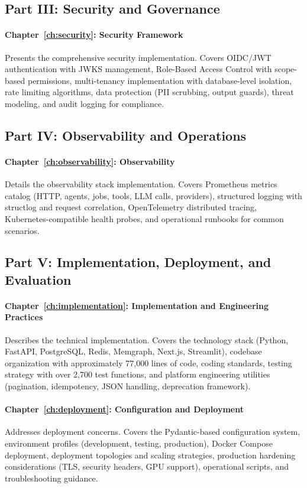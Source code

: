 \subsection{Part III: Security and Governance}

\paragraph{Chapter~\ref{ch:security}: Security Framework}
Presents the comprehensive security implementation. Covers OIDC/JWT authentication with JWKS management, Role-Based Access Control with scope-based permissions, multi-tenancy implementation with database-level isolation, rate limiting algorithms, data protection (PII scrubbing, output guards), threat modeling, and audit logging for compliance.

\subsection{Part IV: Observability and Operations}

\paragraph{Chapter~\ref{ch:observability}: Observability}
Details the observability stack implementation. Covers Prometheus metrics catalog (HTTP, agents, jobs, tools, LLM calls, providers), structured logging with structlog and request correlation, OpenTelemetry distributed tracing, Kubernetes-compatible health probes, and operational runbooks for common scenarios.

\subsection{Part V: Implementation, Deployment, and Evaluation}

\paragraph{Chapter~\ref{ch:implementation}: Implementation and Engineering Practices}
Describes the technical implementation. Covers the technology stack (Python, FastAPI, PostgreSQL, Redis, Memgraph, Next.js, Streamlit), codebase organization with approximately 77,000 lines of code, coding standards, testing strategy with over 2,700 test functions, and platform engineering utilities (pagination, idempotency, JSON handling, deprecation framework).

\paragraph{Chapter~\ref{ch:deployment}: Configuration and Deployment}
Addresses deployment concerns. Covers the Pydantic-based configuration system, environment profiles (development, testing, production), Docker Compose deployment, deployment topologies and scaling strategies, production hardening considerations (TLS, security headers, GPU support), operational scripts, and troubleshooting guidance.

